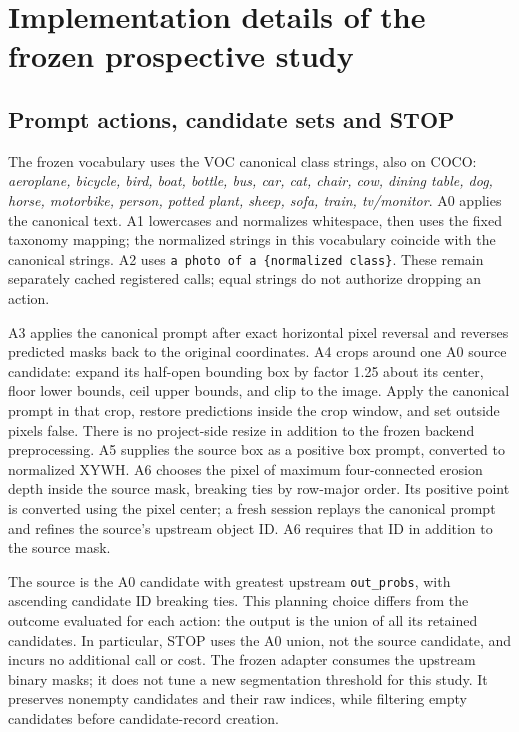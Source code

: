 \section{Implementation details of the frozen prospective study}
\label{sec:implementation-details}


\subsection{Prompt actions, candidate sets and STOP}
The frozen vocabulary uses the VOC canonical class strings, also on COCO:
\emph{aeroplane, bicycle, bird, boat, bottle, bus, car, cat, chair, cow,
dining table, dog, horse, motorbike, person, potted plant, sheep, sofa,
train, tv/monitor}. A0 applies the canonical text. A1 lowercases and
normalizes whitespace, then uses the fixed taxonomy mapping; the normalized
strings in this vocabulary coincide with the canonical strings. A2 uses
\texttt{a photo of a \{normalized class\}}. These remain separately cached
registered calls; equal strings do not authorize dropping an action.

A3 applies the canonical prompt after exact horizontal pixel reversal and
reverses predicted masks back to the original coordinates. A4 crops around
one A0 source candidate: expand its half-open bounding box by factor 1.25
about its center, floor lower bounds, ceil upper bounds, and clip to the
image. Apply the canonical prompt in that crop, restore predictions inside
the crop window, and set outside pixels false. There is no project-side
resize in addition to the frozen backend preprocessing. A5 supplies the
source box as a positive box prompt, converted to normalized XYWH. A6
chooses the pixel of maximum four-connected erosion depth inside the source
mask, breaking ties by row-major order. Its positive point is converted
using the pixel center; a fresh session replays the canonical prompt and
refines the source's upstream object ID. A6 requires that ID in addition to
the source mask.

The source is the A0 candidate with greatest upstream \texttt{out\_probs},
with ascending candidate ID breaking ties. This planning choice differs
from the outcome evaluated for each action: the output is the union of all
its retained candidates. In particular, STOP uses the A0 union, not the
source candidate, and incurs no additional call or cost. The frozen adapter
consumes the upstream binary masks; it does not tune a new segmentation
threshold for this study. It preserves nonempty candidates and their raw
indices, while filtering empty candidates before candidate-record creation.

